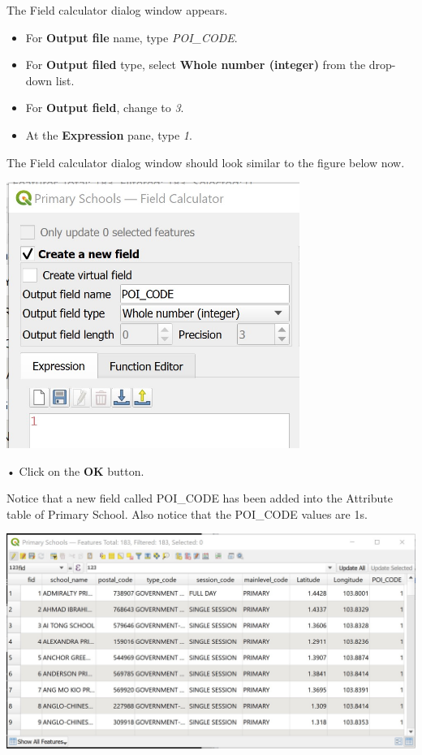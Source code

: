 \documentclass[
  letterpaper,
  DIV=11,
  numbers=noendperiod]{scrreprt}
\providecommand{\tightlist}{%
  \setlength{\itemsep}{0pt}\setlength{\parskip}{0pt}}\usepackage{longtable,booktabs,array}
\begin{document}
The Field calculator dialog window appears.

\begin{itemize}
\tightlist
\item
  For \textbf{Output file} name, type \emph{POI\_CODE}.
\item
  For \textbf{Output filed} type, select \textbf{Whole number (integer)}
  from the drop-down list.
\item
  For \textbf{Output field}, change to \emph{3}.
\item
  At the \textbf{Expression} pane, type \emph{1}.
\end{itemize}

The Field calculator dialog window should look similar to the figure
below now.

\includegraphics[width=3.76042in,height=\textheight]{./img06/image3.jpg}

• Click on the \textbf{OK} button.

Notice that a new field called POI\_CODE has been added into the
Attribute table of Primary School. Also notice that the POI\_CODE values
are 1s.

\includegraphics{./img06/image4.jpg}
\end{document}
